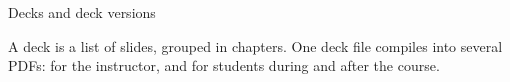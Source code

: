 
\begin{sectionframe}{Decks and deck versions}
	\begin{minipage}[t]{0.9\linewidth}\small
		A deck is a list of slides, grouped in chapters. One deck file compiles into several PDFs: for the instructor, and for students during and after the course.
	\end{minipage}\par\medskip
	\SMChapterAgenda
\end{sectionframe}
